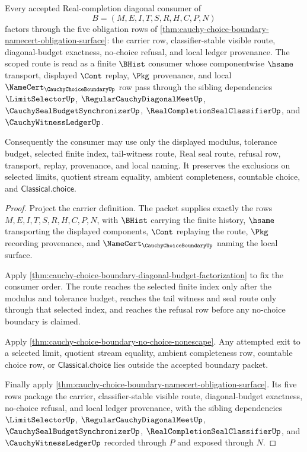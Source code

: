 \begin{theorem}
\label{thm:cauchy-choice-boundary-scoped-consumer-route}
Every accepted Real-completion diagonal consumer of
$$
B=(M,E,I,T,S,R,H,C,P,N)
$$
factors through the five obligation rows of \autoref{thm:cauchy-choice-boundary-namecert-obligation-surface}: the carrier row, classifier-stable visible route, diagonal-budget exactness, no-choice refusal, and local ledger provenance. The scoped route is read as a finite $\BHist$ consumer whose componentwise $\hsame$ transport, displayed $\Cont$ replay, $\Pkg$ provenance, and local $\NameCert_{\CauchyChoiceBoundaryUp}$ row pass through the sibling dependencies $\LimitSelectorUp$, $\RegularCauchyDiagonalMeetUp$, $\CauchySealBudgetSynchronizerUp$, $\RealCompletionSealClassifierUp$, and $\CauchyWitnessLedgerUp$.

Consequently the consumer may use only the displayed modulus, tolerance budget, selected finite index, tail-witness route, Real seal route, refusal row, transport, replay, provenance, and local naming. It preserves the exclusions on selected limits, quotient stream equality, ambient completeness, countable choice, and $\mathsf{Classical.choice}$.
\end{theorem}
\begin{proof}
Project the carrier definition. The packet supplies exactly the rows $M,E,I,T,S,R,H,C,P,N$, with $\BHist$ carrying the finite history, $\hsame$ transporting the displayed components, $\Cont$ replaying the route, $\Pkg$ recording provenance, and $\NameCert_{\CauchyChoiceBoundaryUp}$ naming the local surface.

Apply \autoref{thm:cauchy-choice-boundary-diagonal-budget-factorization} to fix the consumer order. The route reaches the selected finite index only after the modulus and tolerance budget, reaches the tail witness and seal route only through that selected index, and reaches the refusal row before any no-choice boundary is claimed.

Apply \autoref{thm:cauchy-choice-boundary-no-choice-nonescape}. Any attempted exit to a selected limit, quotient stream equality, ambient completeness row, countable choice row, or $\mathsf{Classical.choice}$ lies outside the accepted boundary packet.

Finally apply \autoref{thm:cauchy-choice-boundary-namecert-obligation-surface}. Its five rows package the carrier, classifier-stable visible route, diagonal-budget exactness, no-choice refusal, and local ledger provenance, with the sibling dependencies $\LimitSelectorUp$, $\RegularCauchyDiagonalMeetUp$, $\CauchySealBudgetSynchronizerUp$, $\RealCompletionSealClassifierUp$, and $\CauchyWitnessLedgerUp$ recorded through $P$ and exposed through $N$.
\end{proof}

